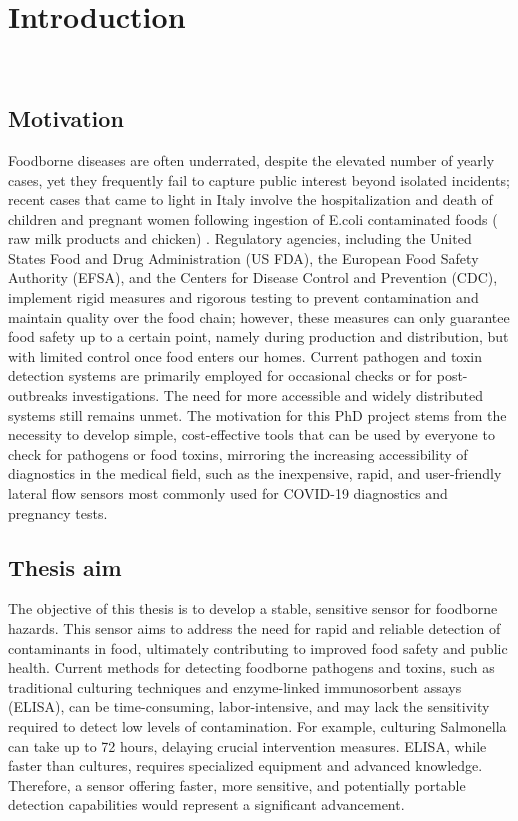 
\chapter{Introduction}
\label{cap:introduction}
\thispagestyle{empty}

\newpage
\thispagestyle{empty}
\ %
\newpage

\section{Motivation}

Foodborne diseases are often underrated, despite the elevated number of yearly
cases, yet they frequently fail to capture public interest beyond isolated
incidents; recent cases that came to light in Italy involve the hospitalization
and death of children and pregnant women following ingestion of E.coli
contaminated foods (\ie{} raw milk products and chicken)
\citep{EcoliBimbo2024,EcoliMamma2025}. Regulatory agencies, including the United
States Food and Drug Administration (US FDA), the European Food Safety Authority
(EFSA), and the Centers for Disease Control and Prevention (CDC), implement
rigid measures and rigorous testing to prevent contamination and maintain
quality over the food chain; however, these measures can only guarantee food
safety up to a certain point, namely during production and distribution, but
with limited control once food enters our homes. Current pathogen and toxin
detection systems are primarily employed for occasional checks or for
post-outbreaks investigations. The need for more accessible and widely
distributed systems still remains unmet. The motivation for this PhD project
stems from the necessity to develop simple, cost-effective tools that can be
used by everyone to check for pathogens or food toxins, mirroring the increasing
accessibility of diagnostics in the medical field, such as the inexpensive,
rapid, and user-friendly lateral flow sensors most commonly used for COVID-19
diagnostics and pregnancy tests.

\section{Thesis aim}

The objective of this thesis is to develop a stable, sensitive sensor for
foodborne hazards. This sensor aims to address the need for rapid and reliable
detection of contaminants in food, ultimately contributing to improved food
safety and public health. Current methods for detecting foodborne pathogens and
toxins, such as traditional culturing techniques and enzyme-linked immunosorbent
assays (ELISA), can be time-consuming, labor-intensive, and may lack the
sensitivity required to detect low levels of contamination. For example,
culturing Salmonella can take up to 72 hours, delaying crucial intervention
measures. ELISA, while faster than cultures, requires specialized equipment and
advanced knowledge. Therefore, a sensor offering faster, more sensitive, and
potentially portable detection capabilities would represent a significant
advancement.

